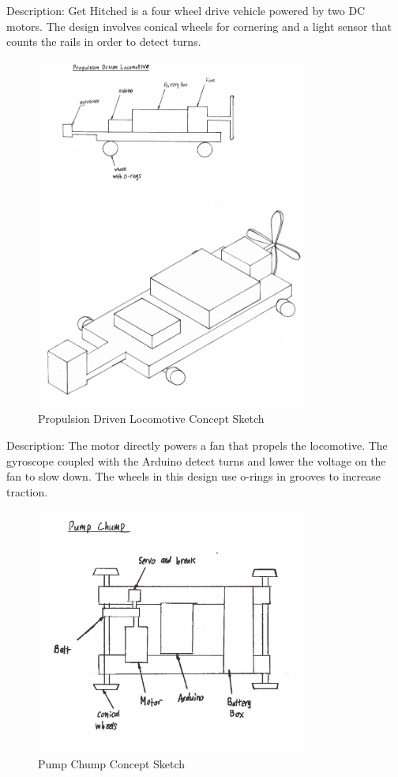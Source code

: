 \documentclass[class=../report, crop=false]{standalone}
\begin{document}
Description: Get Hitched is a four wheel drive vehicle powered by two DC motors.
The design involves conical wheels for cornering and a light sensor that counts the rails in order to detect turns.

\clearpage

\begin{figure}[H]
	\centering
	\includegraphics[width=0.8\textwidth]{../../res/img/pdl}
	\caption{Propulsion Driven Locomotive Concept Sketch}
	\label{app/fig:pdl}
\end{figure}


Description: The motor directly powers a fan that propels the locomotive.
The gyroscope coupled with the Arduino detect turns and lower the voltage on the fan to slow down.
The wheels in this design use o-rings in grooves to increase traction.

\clearpage

\begin{figure}[H]
	\centering
	\includegraphics[width=0.8\textwidth]{../../res/img/pumpchump}
	\caption{Pump Chump Concept Sketch}
	\label{app/fig:pumpchump}
\end{figure}
\end{document}
